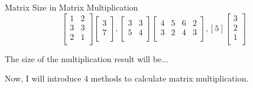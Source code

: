 \documentclass{beamer}
\begin{document}
\begin{frame}{Matrix Size in Matrix Multiplication}
\begin{equation*}
    \left[ \begin{matrix}
        1&		2\\
        3&		3\\
        2&		1\\
    \end{matrix} \right] \left[ \begin{array}{c}
        3\\
        7\\
    \end{array} \right] , \left[ \begin{matrix}
        3&		3\\
        5&		4\\
    \end{matrix} \right] \left[ \begin{matrix}
        4&		5&		6&		2\\
        3&		2&		4&		3\\
    \end{matrix} \right], \left[ 5 \right] \left[ \begin{array}{c}
        3\\
        2\\
        1\\
    \end{array} \right]
\end{equation*}

The size of the multiplication result will be...

Now, I will introduce 4 methods to calculate matrix multiplication.
\end{frame}
\end{document}
